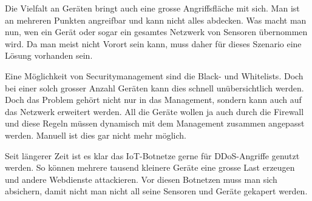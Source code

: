 Die Vielfalt an Geräten bringt auch eine grosse Angriffsfläche mit sich. Man ist an mehreren Punkten angreifbar und kann nicht alles abdecken. Was macht man nun, wen ein Gerät oder sogar ein gesamtes Netzwerk von Sensoren übernommen wird. Da man meist nicht Vorort sein kann, muss daher für dieses Szenario eine Lösung vorhanden sein. 

Eine Möglichkeit von Securitymanagement sind die Black- und Whitelists. Doch bei einer solch grosser Anzahl Geräten kann dies schnell unübersichtlich werden. Doch das Problem gehört nicht nur in das Management, sondern kann auch auf das Netzwerk erweitert werden. All die Geräte wollen ja auch durch die Firewall und diese Regeln müssen dynamisch mit dem Management zusammen angepasst werden. Manuell ist dies gar nicht mehr möglich.

Seit längerer Zeit ist es klar das IoT-Botnetze gerne für DDoS-Angriffe genutzt werden. So können mehrere tausend kleinere Geräte eine grosse Last erzeugen und andere Webdienste attackieren. Vor diesen Botnetzen muss man sich absichern, damit nicht man nicht all seine Sensoren und Geräte gekapert werden. 